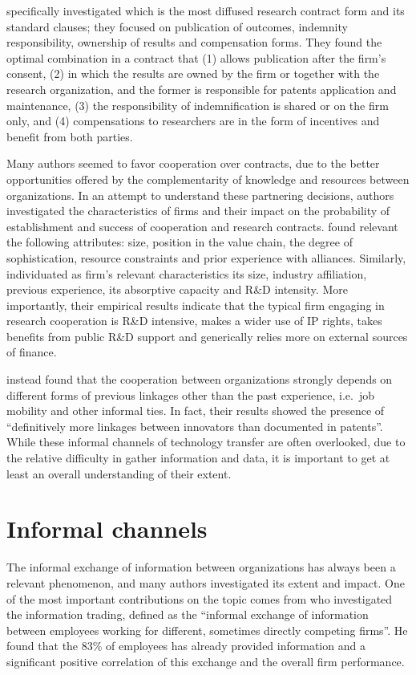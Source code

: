 \citet{Sohn2012} specifically investigated which is the most diffused research contract form and its standard clauses; they focused on publication of outcomes, indemnity responsibility, ownership of results and compensation forms. They found the optimal combination in a contract that (1) allows publication after the firm's consent, (2) in which the results are owned by the firm or together with the research organization, and the former is responsible for patents application and maintenance, (3) the responsibility of indemnification is shared or on the firm only, and (4) compensations to researchers are in the form of incentives and benefit from both parties. 

Many authors seemed to favor cooperation over contracts, due to the better opportunities offered by the complementarity of knowledge and resources between organizations. In an attempt to understand these partnering decisions, authors investigated the characteristics of firms and their impact on the probability of establishment and success of cooperation and research contracts. \citet{Powell1996} found relevant the following attributes: size, position in the value chain, the degree of sophistication, resource constraints and prior experience with alliances. Similarly, \citet{Aristei2016} individuated as firm's relevant characteristics its size, industry affiliation, previous experience, its absorptive capacity and R\&D intensity. More importantly, their empirical results indicate that the typical firm engaging in research cooperation is R\&D intensive, makes a wider use of IP rights, takes benefits from public R\&D support and generically relies more on external sources of finance.

\citet{Cantner2006} instead found that the cooperation between organizations strongly depends on different forms of previous linkages other than the past experience, i.e.\ job mobility and other informal ties. In fact, their results showed the presence of \enquote{definitively more linkages between innovators than documented in patents}. While these informal channels of technology transfer are often overlooked, due to the relative difficulty in gather information and data, it is important to get at least an overall understanding of their extent. 

\section{Informal channels}

The informal exchange of information between organizations has always been a relevant phenomenon, and many authors investigated its extent and impact. One of the most important contributions on the topic comes from \citet{Schrader1991} who investigated the information trading, defined as the \enquote{informal exchange of information between employees working for different, sometimes directly competing firms}. He found that the 83\% of employees has already provided information and a significant positive correlation of this exchange and the overall firm performance.

